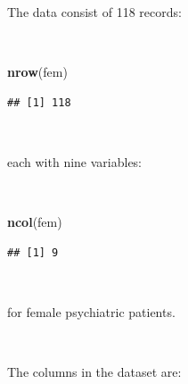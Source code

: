 \documentclass[12pt,a4paper]{book}
\newenvironment{Shaded}{\begin{snugshade}}{\end{snugshade}}
\newcommand{\KeywordTok}[1]{\textcolor[rgb]{0.13,0.29,0.53}{\textbf{#1}}}
\newcommand{\NormalTok}[1]{#1}
\theoremstyle{definition}
\theoremstyle{definition}
\theoremstyle{definition}
\theoremstyle{remark}
\begin{document}
\newpage

The data consist of 118 records:

~

\begin{Shaded}
\begin{Highlighting}[]
\KeywordTok{nrow}\NormalTok{(fem)}
\end{Highlighting}
\end{Shaded}

\begin{verbatim}
## [1] 118
\end{verbatim}

~

each with nine variables:

~

\begin{Shaded}
\begin{Highlighting}[]
\KeywordTok{ncol}\NormalTok{(fem)}
\end{Highlighting}
\end{Shaded}

\begin{verbatim}
## [1] 9
\end{verbatim}

~

for female psychiatric patients.

~

The columns in the dataset are:

~
\end{document}
